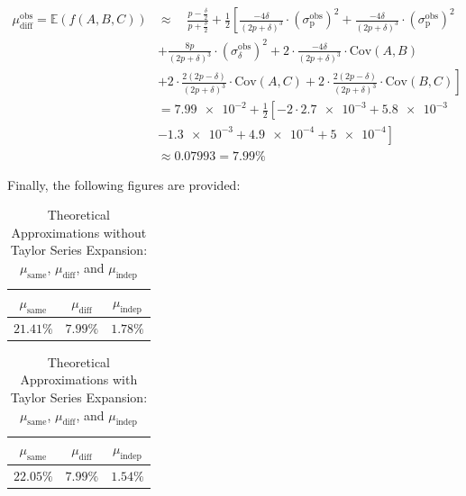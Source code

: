\begin{equation}
    \begin{aligned}
    \mu_{\text{diff}}^{\text{obs}} = \mathbb{E}(f(A,B,C)) &\approx \quad \frac{p - \frac{\delta}{2}}{p + \frac{\delta}{2}} + \frac{1}{2} \left[ \frac{-4\delta}{(2p + \delta)^3}\cdot({\sigma^\text{obs}_{\text{p}}})^2 + \frac{-4\delta}{(2p + \delta)^3}\cdot({\sigma^\text{obs}_{\text{p}}})^2 \right. \\[2mm]
    & \left. + \frac{8p}{(2p + \delta)^3}\cdot({\sigma^\text{obs}_\delta})^2 + 2\cdot\frac{-4\delta}{(2p + \delta)^3}\cdot\text{Cov}(A,B) \right. \\[2mm] 
    & \left. + 2\cdot\frac{2(2p - \delta)}{(2p + \delta)^3}\cdot\text{Cov}(A,C) + 2\cdot\frac{2(2p - \delta)}{(2p + \delta)^3}\cdot\text{Cov}(B,C) \right]\\[10mm]
    & = \num{7.99e-2} + \frac{1}{2} \left[ -2\cdot\num{2.7e-3} + \num{5.8e-3}  \right. \\[2mm]
    & \left. - \num{1.3e-3} + \num{4.9e-4} + \num{5e-4} \right] \\[10mm]
    & \approx 0.07993 = 7.99\%
    \end{aligned}
    \label{eq:mu_diff_obs}
\end{equation}

Finally, the following figures are provided:

\begin{table}[H]
    \centering
    \renewcommand{\arraystretch}{1.25}\begin{tabular}{|c|c|c|}
        \hline
        $\mu_{\text{same}}$ & $\mu_{\text{diff}}$ & $\mu_{\text{indep}}$\\
        \hline
        $21.41\%$ & $7.99\%$ & $1.78\%$\\
        \hline
    \end{tabular}
\caption{Theoretical Approximations without Taylor Series Expansion: $\mu_{\text{same}}$, $\mu_{\text{diff}}$, and $\mu_{\text{indep}}$}
\label{tab:mu_approx}
\end{table}


\begin{table}[H]
    \centering
    \renewcommand{\arraystretch}{1.25}\begin{tabular}{|c|c|c|}
        \hline
        $\mu_{\text{same}}$ & $\mu_{\text{diff}}$ & $\mu_{\text{indep}}$\\
        \hline
        $22.05\%$ & $7.99\%$ & $1.54\%$\\
        \hline
    \end{tabular}
\caption{Theoretical Approximations with Taylor Series Expansion: $\mu_{\text{same}}$, $\mu_{\text{diff}}$, and $\mu_{\text{indep}}$}
\label{tab:approximation_mu_taylor}
\end{table}


